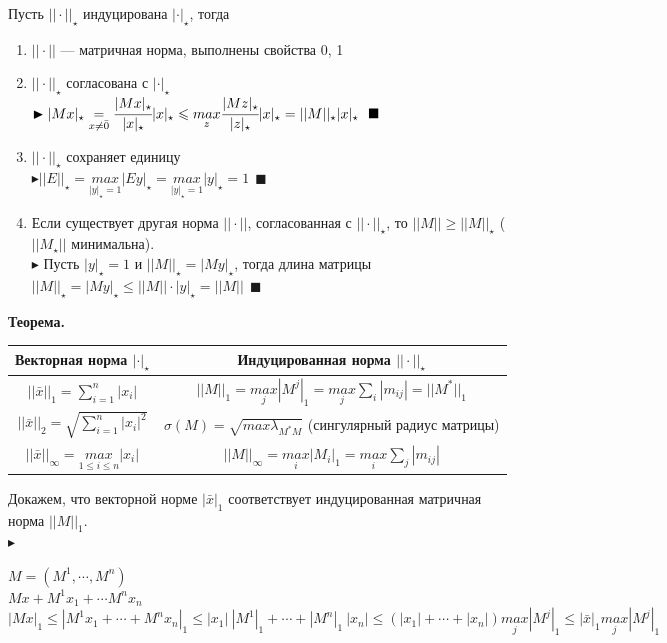\documentclass[12pt]{article}
\theoremstyle{definition}
\numberwithin{equation}{section}
\begin{document}
Пусть $||\cdot ||_{\star}$ индуцирована $|\cdot |_{\star}$, тогда \begin{enumerate}
    \item $||\cdot ||$ --- матричная норма, выполнены свойства 0, 1
    \item $||\cdot ||_{\star}$ согласована с $|\cdot |_{\star}$\\
    $\blacktriangleright |Mx|_{\star}\underset{x\neq \bar 0}{=}\cfrac{|Mx|_{\star}}{|x|_{\star}}|x|_{\star} \leqslant \underset{z}{max}\cfrac{|Mz|_{\star}}{|z|_{\star}}|x|_{\star}=||M||_{\star}|x|_{\star}~~\blacksquare$
    \item $||\cdot ||_{\star}$ сохраняет единицу\\
    $\blacktriangleright ||E||_{\star}=\underset{|y|_{\star}=1}{max}|Ey|_{\star}=\underset{|y|_{\star}=1}{max}|y|_{\star}=1~~\blacksquare$ 
    \item Если существует другая норма $||\cdot ||$, согласованная с $||\cdot||_{\star}$, то $||M|| \geqslant ||M||_{\star}$ ($||M_{\star}||$ минимальна).\\
    $\blacktriangleright$ Пусть $|y|_{\star}=1$ и $||M||_{\star}=|My|_{\star}$, тогда длина матрицы $||M||_{\star}=|My|_{\star} \leqslant ||M||\cdot |y|_{\star}=||M||~~\blacksquare$
\end{enumerate}
\textbf{Теорема.}
\begin{center}
  \begin{tabular}{ | c || c |}
    \hline
     Векторная норма $|\cdot|_{\star}$ & Индуцированная норма $||\cdot||_{\star}$\\ \hline \hline
     $||\bar x||_1 = \sum\limits_{i=1}^n |x_i|$ & $||M||_1 = \underset{j}{max}|M^j|_1=\underset{j}{max}\sum\limits_i|m_{ij}|=||M^*||_1$  \\ \hline \hline
     $||\bar x||_2  = \sqrt{\sum\limits_{i=1}^n |x_i|^2}$ & $\sigma(M)=\sqrt{max \lambda_{M^*M}}$ (сингулярный радиус матрицы) \\
    \hline \hline
    $||\bar x||_\infty = \underset{1\leq i \leq n}{max} |x_i|$ & $||M||_{\infty} = \underset{i}{max}|M_i|_1=\underset{i}{max}\sum\limits_j|m_{ij}|$ \\ \hline
  \end{tabular}
\end{center}
Докажем, что векторной норме $|\bar x|_1$ соответствует индуцированная матричная норма $||M||_1$.\\
$\blacktriangleright$ \begin{center} $M=(M^1,\cdots, M^n)$\\
$Mx+M^1x_1+\cdots M^nx_n$\\
$|Mx|_1\leqslant |M^1x_1+\cdots+M^nx_n|_1\leqslant|x_1|~|M^1|_1+\cdots+|M^n|_1~|x_n|\leqslant(|x_1|+\cdots+|x_n|)\underset{j}{max}|M^j|_1\leqslant|\bar x|_1\underset{j}{max}|M^j|_1$\end{center}
\end{document}
